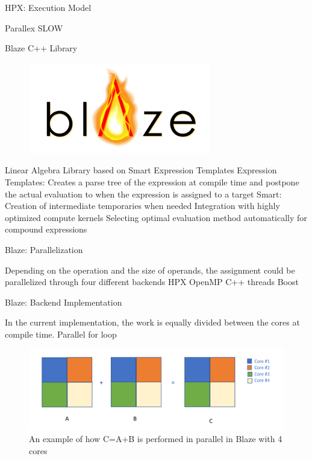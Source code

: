\documentclass[10pt]{beamer}
\begin{document}
\begin{frame}{HPX: Execution Model}
	\begin{outline}
		\1Parallex
		\2SLOW
	\end{outline}
\end{frame}


\begin{frame}{Blaze C++ Library}
\begin{outline}
\begin{figure}[H]

	\includegraphics[width=0.22\linewidth]{images/blaze.png}
\end{figure}	
 Linear Algebra Library based on Smart Expression Templates
 \1Expression Templates:
	\2Creates a parse tree of the expression at compile time and postpone the actual evaluation to when the expression is assigned to a target
\1 Smart: 
	\2Creation of intermediate temporaries when needed
	\2Integration with highly optimized compute kernels
	\2Selecting optimal evaluation method automatically for compound expressions
\end{outline}
\end{frame}


\begin{frame}{Blaze: Parallelization}
	\begin{outline}
		Depending on the operation and the size of operands, the assignment could be parallelized through four different backends
		\1 HPX 
		\1OpenMP
		\1C++ threads
		\1Boost
	\end{outline}
\end{frame}

\begin{frame}{Blaze: Backend Implementation}
	\begin{outline}
		In the current implementation, the work is equally divided between the cores at compile time. 
		\1Parallel for loop
		\begin{figure}
			\centering
			\includegraphics[width=0.72\linewidth]{images/old_backend.png}
			\caption{An example of how C=A+B is performed in parallel in Blaze with 4 cores}	
		\end{figure}	

	\end{outline}
\end{frame}
\end{document}
